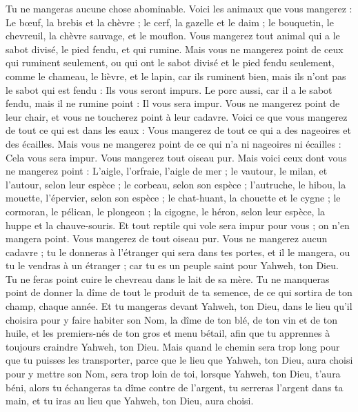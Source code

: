 \begin{multicols}{2}
Tu ne mangeras aucune chose abominable.
Voici les animaux que vous mangerez : Le bœuf, la brebis et la chèvre ;
le cerf, la gazelle et le daim ; le bouquetin, le chevreuil, la chèvre sauvage, et le mouflon.
Vous mangerez tout animal qui a le sabot divisé, le pied fendu, et qui rumine.
Mais vous ne mangerez point de ceux qui ruminent seulement, ou qui ont le sabot divisé et le pied fendu seulement, comme le chameau, le lièvre, et le lapin, car ils ruminent bien, mais ils n'ont pas le sabot qui est fendu : Ils vous seront impurs.
Le porc aussi, car il a le sabot fendu, mais il ne rumine point : Il vous sera impur. Vous ne mangerez point de leur chair, et vous ne toucherez point à leur cadavre.
Voici ce que vous mangerez de tout ce qui est dans les eaux : Vous mangerez de tout ce qui a des nageoires et des écailles.
Mais vous ne mangerez point de ce qui n'a ni nageoires ni écailles : Cela vous sera impur.
Vous mangerez tout oiseau pur.
Mais voici ceux dont vous ne mangerez point : L'aigle, l'orfraie, l'aigle de mer ;
le vautour, le milan, et l'autour, selon leur espèce ;
le corbeau, selon son espèce ;
l'autruche, le hibou, la mouette, l'épervier, selon son espèce ;
le chat-huant, la chouette et le cygne ;
le cormoran, le pélican, le plongeon ;
la cigogne, le héron, selon leur espèce, la huppe et la chauve-souris.
Et tout reptile qui vole sera impur pour vous ; on n'en mangera point.
Vous mangerez de tout oiseau pur.
Vous ne mangerez aucun cadavre ; tu le donneras à l'étranger qui sera dans tes portes, et il le mangera, ou tu le vendras à un étranger ; car tu es un peuple saint pour Yahweh, ton Dieu. Tu ne feras point cuire le chevreau dans le lait de sa mère.
Tu ne manqueras point de donner la dîme de tout le produit de ta semence, de ce qui sortira de ton champ, chaque année.
Et tu mangeras devant Yahweh, ton Dieu, dans le lieu qu'il choisira pour y faire habiter son Nom, la dîme de ton blé, de ton vin et de ton huile, et les premiers-nés de ton gros et menu bétail, afin que tu apprennes à toujours craindre Yahweh, ton Dieu.
Mais quand le chemin sera trop long pour que tu puisses les transporter, parce que le lieu que Yahweh, ton Dieu, aura choisi pour y mettre son Nom, sera trop loin de toi, lorsque Yahweh, ton Dieu, t'aura béni,
alors tu échangeras ta dîme contre de l'argent, tu serreras l'argent dans ta main, et tu iras au lieu que Yahweh, ton Dieu, aura choisi.

\end{multicols}
